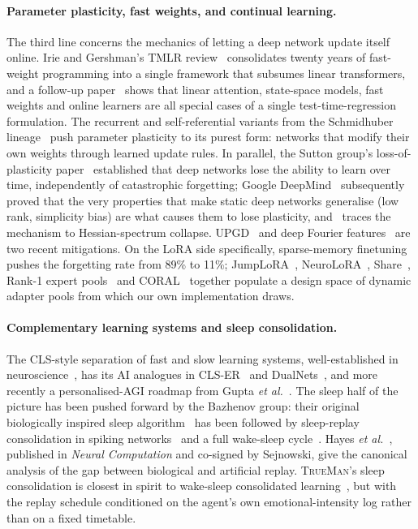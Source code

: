 \documentclass[pdflatex,sn-mathphys-num]{sn-jnl}
\newcommand{\TrueMan}{\textsc{TrueMan}}
\theoremstyle{thmstyleone}
\theoremstyle{thmstylethree}
\begin{document}
\paragraph{Parameter plasticity, fast weights, and continual learning.} The third line concerns the mechanics of letting a deep network update itself online. Irie and Gershman's TMLR review~\cite{irie2025fastweight} consolidates twenty years of fast-weight programming into a single framework that subsumes linear transformers, and a follow-up paper~\cite{wang2025testtime} shows that linear attention, state-space models, fast weights and online learners are all special cases of a single test-time-regression formulation. The recurrent and self-referential variants from the Schmidhuber lineage~\cite{irie2021goingbeyond, irie2022neuralde, irie2023practical} push parameter plasticity to its purest form: networks that modify their own weights through learned update rules. In parallel, the Sutton group's loss-of-plasticity paper~\cite{dohare2023plasticity} established that deep networks lose the ability to learn over time, independently of catastrophic forgetting; Google DeepMind~\cite{joudaki2025barriers} subsequently proved that the very properties that make static deep networks generalise (low rank, simplicity bias) are what causes them to lose plasticity, and~\cite{he2025spectral} traces the mechanism to Hessian-spectrum collapse. UPGD~\cite{elsayed2024upgd} and deep Fourier features~\cite{lewandowski2024fourier} are two recent mitigations. On the LoRA side specifically, sparse-memory finetuning~\cite{lin2025sparse} pushes the forgetting rate from 89\% to 11\%; JumpLoRA~\cite{dragomir2026jumplora}, NeuroLoRA~\cite{yang2026neurolora}, Share~\cite{kaushik2026share}, Rank-1 expert pools~\cite{fa2026rank1} and CORAL~\cite{luo2026coral} together populate a design space of dynamic adapter pools from which our own implementation draws.

\paragraph{Complementary learning systems and sleep consolidation.} The CLS-style separation of fast and slow learning systems, well-established in neuroscience~\cite{hayes2021replay}, has its AI analogues in CLS-ER~\cite{arani2022clser} and DualNets~\cite{pham2022dualnets}, and more recently a personalised-AGI roadmap from Gupta \emph{et al.}~\cite{gupta2025cls}. The sleep half of the picture has been pushed forward by the Bazhenov group: their original biologically inspired sleep algorithm~\cite{krishnan2019sleep} has been followed by sleep-replay consolidation in spiking networks~\cite{delanois2026sleep} and a full wake-sleep cycle~\cite{sorrenti2024wake}. Hayes \emph{et al.}~\cite{hayes2021replay}, published in \emph{Neural Computation} and co-signed by Sejnowski, give the canonical analysis of the gap between biological and artificial replay. \TrueMan{}'s sleep consolidation is closest in spirit to wake-sleep consolidated learning~\cite{sorrenti2024wake}, but with the replay schedule conditioned on the agent's own emotional-intensity log rather than on a fixed timetable.
\end{document}
